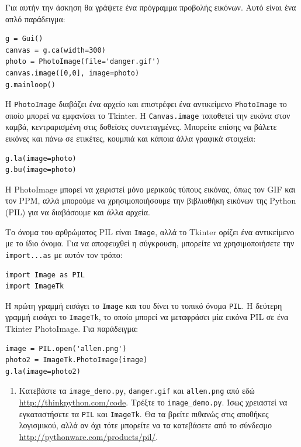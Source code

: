 \documentclass[10pt]{book}
\begin{document}
\begin{exercise}

Για αυτήν την άσκηση θα γράψετε ένα πρόγραμμα προβολής εικόνων.  Αυτό είναι ένα απλό παράδειγμα:

\begin{verbatim}
g = Gui()
canvas = g.ca(width=300)
photo = PhotoImage(file='danger.gif')
canvas.image([0,0], image=photo)
g.mainloop()
\end{verbatim}
%
Η {\tt PhotoImage} διαβάζει ένα αρχείο και επιστρέφει ένα αντικείμενο {\tt PhotoImage} το οποίο μπορεί
να εμφανίσει το Tkinter.  Η {\tt Canvas.image} τοποθετεί την εικόνα στον καμβά, κεντραρισμένη στις
δοθείσες συντεταγμένες.  Μπορείτε επίσης να βάλετε εικόνες και πάνω σε ετικέτες, κουμπιά και κάποια
άλλα γραφικά στοιχεία:

\begin{verbatim}
g.la(image=photo)
g.bu(image=photo)
\end{verbatim}
%
Η PhotoImage μπορεί να χειριστεί μόνο μερικούς τύπους εικόνας, όπως τον GIF και τον PPM, αλλά μπορούμε
να χρησιμοποιήσουμε την βιβλιοθήκη εικόνων της Python (PIL) για να διαβάσουμε και άλλα αρχεία.

Το όνομα του αρθρώματος PIL είναι {\tt Image}, αλλά το Tkinter ορίζει ένα αντικείμενο με το ίδιο όνομα.
Για να αποφευχθεί η σύγκρουση, μπορείτε να χρησιμοποιήσετε την {\tt import...as} με αυτόν τον τρόπο:

\begin{verbatim}
import Image as PIL
import ImageTk
\end{verbatim}
%
Η πρώτη γραμμή εισάγει το {\tt Image} και του δίνει το τοπικό όνομα {\tt PIL}.  Η δεύτερη γραμμή εισάγει
το {\tt ImageTk}, το οποίο μπορεί να μεταφράσει μία εικόνα PIL σε ένα Tkinter PhotoImage.  Για παράδειγμα:

\begin{verbatim}
image = PIL.open('allen.png')
photo2 = ImageTk.PhotoImage(image)
g.la(image=photo2)
\end{verbatim}
%

 
\begin{enumerate}

\item Κατεβάστε τα \verb"image_demo.py", \verb"danger.gif" και \verb"allen.png" από εδώ
\url{http://thinkpython.com/code}. Τρέξτε το \verb"image_demo.py". Ίσως χρειαστεί να εγκαταστήσετε τα
{\tt PIL} και {\tt ImageTk}.  Θα τα βρείτε πιθανώς στις αποθήκες λογισμικού, αλλά αν όχι τότε μπορείτε
να τα κατεβάσετε από το σύνδεσμο \url{http://pythonware.com/products/pil/}. 


\end{enumerate}
\end{exercise}
\end{document}
